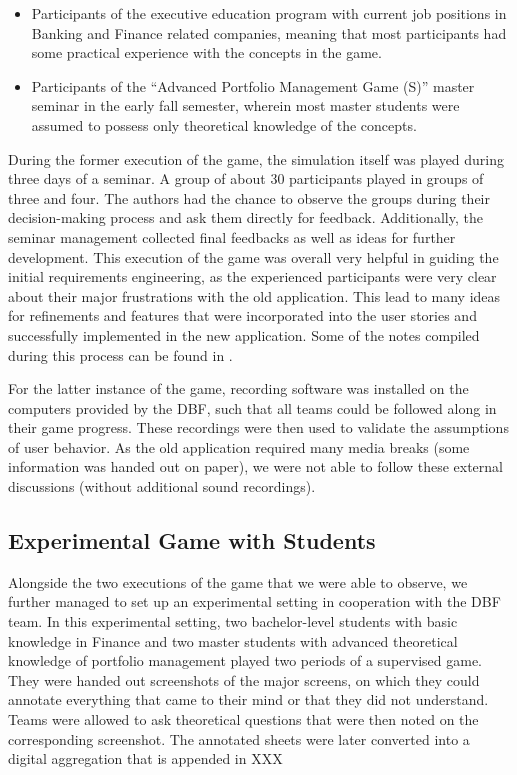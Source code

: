 \begin{itemize}
  \item Participants of the executive education program with current job positions in Banking and Finance related companies, meaning that most participants had some practical experience with the concepts in the game.
  \item Participants of the ``Advanced Portfolio Management Game (S)'' master seminar in the early fall semester, wherein most master students were assumed to possess only theoretical knowledge of the concepts.
\end{itemize}

During the former execution of the game, the simulation itself was played during three days of a seminar. A group of about 30 participants played in groups of three and four. The authors had the chance to observe the groups during their decision-making process and ask them directly for feedback. Additionally, the seminar management collected final feedbacks as well as ideas for further development.
This execution of the game was overall very helpful in guiding the initial requirements engineering, as the experienced participants were very clear about their major frustrations with the old application. This lead to many ideas for refinements and features that were incorporated into the user stories and successfully implemented in the new application. Some of the notes compiled during this process can be found in .

For the latter instance of the game, recording software was installed on the computers provided by the DBF, such that all teams could be followed along in their game progress. These recordings were then used to validate the assumptions of user behavior. As the old application required many media breaks (some information was handed out on paper), we were not able to follow these external discussions (without additional sound recordings).


\subsection{Experimental Game with Students}
Alongside the two executions of the game that we were able to observe, we further managed to set up an experimental setting in cooperation with the DBF team. In this experimental setting, two bachelor-level students with basic knowledge in Finance and two master students with advanced theoretical knowledge of portfolio management played two periods of a supervised game. They were handed out screenshots of the major screens, on which they could annotate everything that came to their mind or that they did not understand. Teams were allowed to ask theoretical questions that were then noted on the corresponding screenshot. The annotated sheets were later converted into a digital aggregation that is appended in XXX \\

